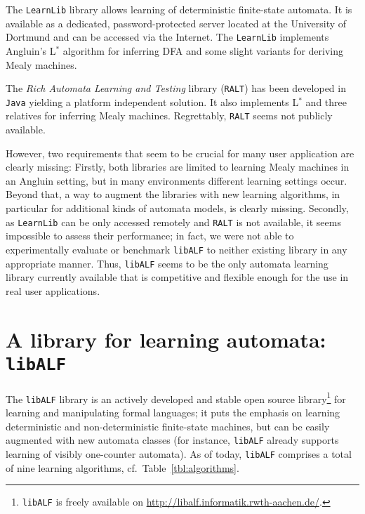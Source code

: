 \documentclass[a4paper, fontsize=11pt, DIV=12, parskip=half]{scrartcl}
\newcommand{\libalf}{\texttt{libALF}\xspace}
\newcommand{\java}{\texttt{Java}\xspace}
\newcommand{\learnlib}{\texttt{LearnLib}\xspace}
\newcommand{\ralt}{\texttt{RALT}\xspace}
\newcommand{\libalfWebSite}{\url{http://libalf.informatik.rwth-aachen.de/}\xspace}
\newcommand{\lstar}{{\textsf{L}}$^\ast$\xspace}
\begin{document}
The \learnlib library \cite{DBLP:journals/sttt/RaffeltSBM09} allows learning of deterministic finite-state automata. It is available as a dedicated, password-protected server located at the University of Dortmund and can be accessed via the Internet. The \learnlib implements Angluin's \lstar algorithm for inferring DFA and some slight variants for deriving Mealy machines.

The \emph{Rich Automata Learning and Testing} library \cite{PHDShahbaz08} (\ralt) has been developed in \java yielding a platform independent solution. It also implements \lstar and three relatives for inferring Mealy machines. Regrettably, \ralt seems not publicly available.

However, two requirements that seem to be crucial for many user application are clearly missing: Firstly, both libraries are limited to learning Mealy machines in an Angluin setting, but in many environments different learning settings occur. Beyond that, a way to augment the libraries with new learning algorithms, in particular for additional kinds of automata models, is clearly missing. Secondly, as \learnlib can be only accessed remotely and \ralt is not available, it seems impossible to assess their performance; in fact, we were not able to experimentally evaluate or benchmark \libalf to neither existing library in any appropriate manner. Thus, \libalf seems to be the only automata learning library currently available that is competitive and flexible enough for the use in real user applications.

\section{A library for learning automata: \libalf}

The \libalf library is an actively developed and stable open source library\footnote{\libalf is freely available on \libalfWebSite.} for learning and manipulating formal languages; it puts the emphasis on learning deterministic and non-deterministic finite-state machines, but can be easily augmented with new automata classes (for instance, \libalf already supports learning of visibly one-counter automata). As of today, \libalf comprises a total of nine learning algorithms, cf.\ Table~\ref{tbl:algorithms}.
\end{document}
